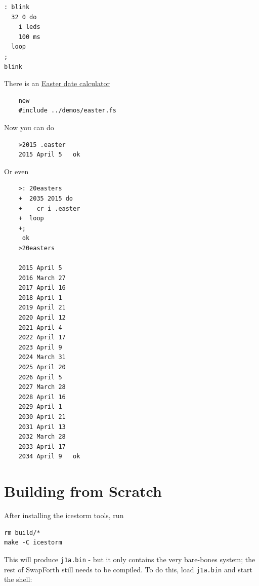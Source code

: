 \documentclass[10pt]{book}
\newcommand{\mach}[1]{\texttt{#1}}
\begin{document}
\begin{framed}
\begin{Verbatim}[commandchars=\\\{\}]
: blink
  32 0 do
    i leds
    100 ms
  loop
;
blink
\end{Verbatim}
\end{framed}

There is an
\href{http://www.wilbaden.com/neil_bawd/easter.txt}{Easter date calculator}
 

\begin{framed}
\begin{Verbatim}
    new
    #include ../demos/easter.fs
\end{Verbatim}
\end{framed}
    
Now you can do

\begin{framed}
\begin{Verbatim}
    >2015 .easter
    2015 April 5   ok
\end{Verbatim}
\end{framed}

Or even

\begin{framed}
\begin{Verbatim}
    >: 20easters
    +  2035 2015 do
    +    cr i .easter
    +  loop
    +;
     ok
    >20easters

    2015 April 5 
    2016 March 27 
    2017 April 16 
    2018 April 1 
    2019 April 21 
    2020 April 12 
    2021 April 4 
    2022 April 17 
    2023 April 9 
    2024 March 31 
    2025 April 20 
    2026 April 5 
    2027 March 28 
    2028 April 16 
    2029 April 1 
    2030 April 21 
    2031 April 13 
    2032 March 28 
    2033 April 17 
    2034 April 9   ok
\end{Verbatim}
\end{framed}

\section{Building from Scratch}

After installing the icestorm tools, run

\begin{Verbatim}
rm build/*
make -C icestorm
\end{Verbatim}

\noindent
This will produce \mach{j1a.bin} - but it only contains the very bare-bones system;
the rest of SwapForth still needs to be compiled.
To do this, load \mach{j1a.bin} and start the shell:
\end{document}
